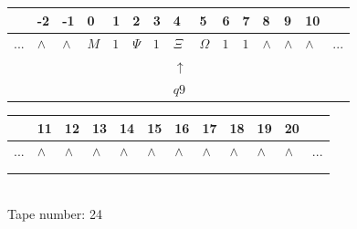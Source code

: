 \documentclass[11pt]{article}
\begin{document}
\begin{table}[H]
\centering
\begin{tabular}{lllllllllllllll}
 & -2 & -1 & 0 & 1 & 2 & 3 & 4 & 5 & 6 & 7 & 8 & 9 & 10 & \\
\hline
$...$ & \multicolumn{1}{|l|}{$\wedge$} & \multicolumn{1}{|l|}{$\wedge$} & \multicolumn{1}{|l|}{$M$} & \multicolumn{1}{|l|}{$1$} & \multicolumn{1}{|l|}{$\Psi$} & \multicolumn{1}{|l|}{$1$} & \multicolumn{1}{|l|}{$\Xi$} & \multicolumn{1}{|l|}{$\Omega$} & \multicolumn{1}{|l|}{$1$} & \multicolumn{1}{|l|}{$1$} & \multicolumn{1}{|l|}{$\wedge$} & \multicolumn{1}{|l|}{$\wedge$} & \multicolumn{1}{|l|}{$\wedge$} & $...$\\
\hline
&  &  &  &  &  &  & $\uparrow$ &  &  &  &  &  &  &  \\
&  &  &  &  &  &  & $ q9 $ &  &  &  &  &  &  &  \\
\end{tabular}
\begin{tabular}{llllllllllll}
 & 11 & 12 & 13 & 14 & 15 & 16 & 17 & 18 & 19 & 20 & \\
\hline
$...$ & \multicolumn{1}{|l|}{$\wedge$} & \multicolumn{1}{|l|}{$\wedge$} & \multicolumn{1}{|l|}{$\wedge$} & \multicolumn{1}{|l|}{$\wedge$} & \multicolumn{1}{|l|}{$\wedge$} & \multicolumn{1}{|l|}{$\wedge$} & \multicolumn{1}{|l|}{$\wedge$} & \multicolumn{1}{|l|}{$\wedge$} & \multicolumn{1}{|l|}{$\wedge$} & \multicolumn{1}{|l|}{$\wedge$} & $...$\\
\hline
&  &  &  &  &  &  &  &  &  &  &  \\
&  &  &  &  &  &  &  &  &  &  &  \\
\end{tabular}
\\
Tape number: 24
\noindent\makebox[\linewidth]{\hdashrule{\textwidth}{1pt}{1pt}}\end{table}
\end{document}
